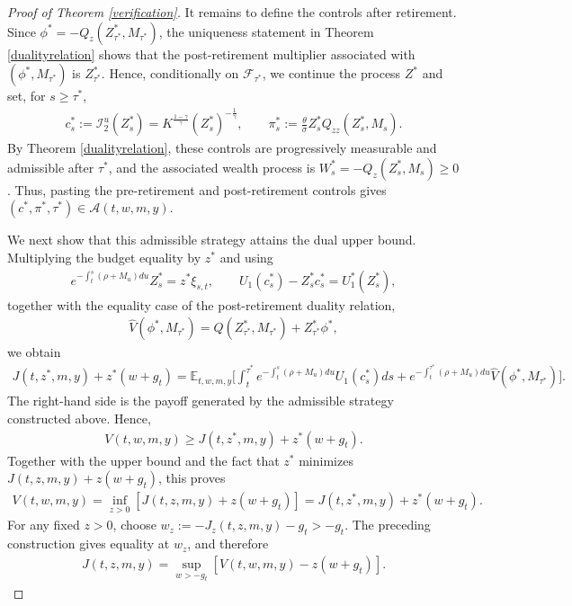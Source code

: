 \documentclass[a4paper,11pt]{amsart}
\numberwithin{equation}{section}
\begin{document}
{\begin{proof}[Proof of Theorem \ref{verification}]
It remains to define the controls after retirement. Since $\phi^\ast=-Q_z(Z_{\tau^\ast}^\ast,M_{\tau^\ast})$, the uniqueness statement in Theorem \ref{dualityrelation} shows that the post-retirement multiplier associated with $(\phi^\ast,M_{\tau^\ast})$ is $Z_{\tau^\ast}^\ast$. Hence, conditionally on $\mathcal F_{\tau^\ast}$, we continue the process $Z^\ast$ and set, for $s\geq\tau^\ast$,
\begin{align*}
c_s^\ast:=\mathcal I_2^u(Z_s^\ast)=K^{\frac{1-\gamma}{\gamma}}(Z_s^\ast)^{-\frac{1}{\gamma}},\qquad
\pi_s^\ast:=\frac{\theta}{\sigma}Z_s^\ast Q_{zz}(Z_s^\ast,M_s).
\end{align*}
By Theorem \ref{dualityrelation}, these controls are progressively measurable and admissible after $\tau^\ast$, and the associated wealth process is $W_s^\ast=-Q_z(Z_s^\ast,M_s)\geq0$. Thus, pasting the pre-retirement and post-retirement controls gives $(c^\ast,\pi^\ast,\tau^\ast)\in\mathcal A(t,w,m,y)$.

We next show that this admissible strategy attains the dual upper bound. Multiplying the budget equality by $z^\ast$ and using
\begin{align*}
e^{-\int_t^s(\rho+M_u)du}Z_s^\ast=z^\ast\xi_{s,t},\qquad U_1(c_s^\ast)-Z_s^\ast c_s^\ast=U_1^\ast(Z_s^\ast),
\end{align*}
together with the equality case of the post-retirement duality relation,
\begin{align*}
\widehat V(\phi^\ast,M_{\tau^\ast})=Q(Z_{\tau^\ast}^\ast,M_{\tau^\ast})+Z_{\tau^\ast}^\ast\phi^\ast,
\end{align*}
we obtain
\begin{align*}
J(t,z^\ast,m,y)+z^\ast(w+g_t)=\mathbb E_{t,w,m,y}\bigg[\int_t^{\tau^\ast}e^{-\int_t^s(\rho+M_u)du}U_1(c_s^\ast)ds+e^{-\int_t^{\tau^\ast}(\rho+M_u)du}\widehat V(\phi^\ast,M_{\tau^\ast})\bigg].
\end{align*}
The right-hand side is the payoff generated by the admissible strategy constructed above. Hence,
\begin{align*}
V(t,w,m,y)\geq J(t,z^\ast,m,y)+z^\ast(w+g_t).
\end{align*}
Together with the upper bound and the fact that $z^\ast$ minimizes $J(t,z,m,y)+z(w+g_t)$, this proves
\begin{align*}
V(t,w,m,y)=\inf_{z>0}[J(t,z,m,y)+z(w+g_t)]=J(t,z^\ast,m,y)+z^\ast(w+g_t).
\end{align*}
For any fixed $z>0$, choose $w_z:=-J_z(t,z,m,y)-g_t>-g_t$. The preceding construction gives equality at $w_z$, and therefore
\begin{align*}
J(t,z,m,y)=\sup_{w>-g_t}[V(t,w,m,y)-z(w+g_t)].
\end{align*}


\end{proof}}
\end{document}

